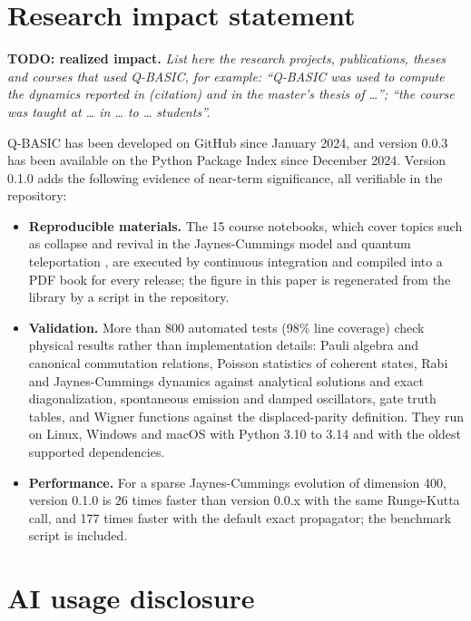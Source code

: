 \documentclass[
]{article}
\providecommand{\tightlist}{%
  \setlength{\itemsep}{0pt}\setlength{\parskip}{0pt}}
\begin{document}
\section{Research impact statement}\label{research-impact-statement}

\textbf{TODO: realized impact.} \emph{List here the research projects,
publications, theses and courses that used Q-BASIC, for example:
``Q-BASIC was used to compute the dynamics reported in (citation) and in
the master's thesis of \ldots{}''; ``the course was taught at \ldots{}
in \ldots{} to \ldots{} students''.}

Q-BASIC has been developed on GitHub since January 2024, and version
0.0.3 has been available on the Python Package Index since December
2024. Version 0.1.0 adds the following evidence of near-term
significance, all verifiable in the repository:

\begin{itemize}
\tightlist
\item
  \textbf{Reproducible materials.} The 15 course notebooks, which cover
  topics such as collapse and revival in the Jaynes-Cummings model
  \citep{eberly1980} and quantum teleportation \citep{bennett1993}, are
  executed by continuous integration and compiled into a PDF book for
  every release; the figure in this paper is regenerated from the
  library by a script in the repository.
\item
  \textbf{Validation.} More than 800 automated tests (98\% line
  coverage) check physical results rather than implementation details:
  Pauli algebra and canonical commutation relations, Poisson statistics
  of coherent states, Rabi and Jaynes-Cummings dynamics against
  analytical solutions and exact diagonalization, spontaneous emission
  and damped oscillators, gate truth tables, and Wigner functions
  against the displaced-parity definition. They run on Linux, Windows
  and macOS with Python 3.10 to 3.14 and with the oldest supported
  dependencies.
\item
  \textbf{Performance.} For a sparse Jaynes-Cummings evolution of
  dimension 400, version 0.1.0 is 26 times faster than version 0.0.x
  with the same Runge-Kutta call, and 177 times faster with the default
  exact propagator; the benchmark script is included.
\end{itemize}

\section{AI usage disclosure}\label{ai-usage-disclosure}
\end{document}
